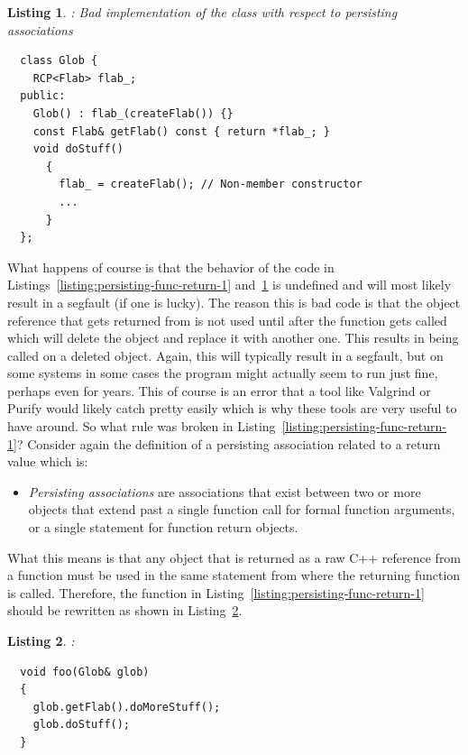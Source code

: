 \documentclass[pdf,ps2pdf,11pt]{SANDreport}
\newtheorem{listing}{Listing}
\begin{document}
{}\begin{listing}: Bad implementation of the {} class with
respect to persisting associations
\label{listing:bad-Glob-non-persisting}
{\small\begin{verbatim}
  class Glob {
    RCP<Flab> flab_;
  public:
    Glob() : flab_(createFlab()) {}
    const Flab& getFlab() const { return *flab_; }
    void doStuff()
      {
        flab_ = createFlab(); // Non-member constructor
        ...
      }
  };
\end{verbatim}}
\end{listing}


What happens of course is that the behavior of the code in
Listings~\ref{listing:persisting-func-return-1}
and~\ref{listing:bad-Glob-non-persisting} is undefined and will most
likely result in a segfault (if one is lucky).  The reason this is bad
code is that the {} object reference that gets returned from
{} is not used until after the function
{} gets called which will delete the {}
object and replace it with another one.  This results in
{} being called on a deleted object.  Again,
this will typically result in a segfault, but on some systems in some
cases the program might actually seem to run just fine, perhaps even
for years.  This of course is an error that a tool like Valgrind or
Purify would likely catch pretty easily which is why these tools are
very useful to have around.  So what rule was broken in
Listing~\ref{listing:persisting-func-return-1}?  Consider again the
definition of a persisting association related to a return value which
is:

\begin{itemize}

{}\item\textit{Persisting associations} are associations that exist
between two or more objects that extend past a single function call
for formal function arguments, or a single statement for function
return objects.

\end{itemize}

What this means is that any object that is returned as a raw C++
reference from a function must be used in the same statement from
where the returning function is called.  Therefore, the function in
Listing~\ref{listing:persisting-func-return-1} should be rewritten
as shown in Listing~\ref{listing:non-persisting-func-return-1}.


\begin{listing}:\\
\label{listing:non-persisting-func-return-1}
{\small\begin{verbatim}
  void foo(Glob& glob)
  {
    glob.getFlab().doMoreStuff();
    glob.doStuff();
  }
\end{verbatim}}
\end{listing}
\end{document}

